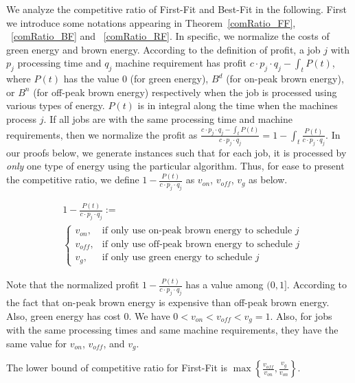 \documentclass[conference]{IEEEtran}
\begin{document}
We analyze the competitive ratio of First-Fit and Best-Fit in the following. First we introduce some notations appearing in Theorem~\ref{comRatio_FF}, ~\ref{comRatio_BF} and ~\ref{comRatio_RF}. In specific, we normalize the costs of green energy and brown energy. According to the definition of profit, a job $j$ with $p_j$ processing time and $q_j$ machine requirement has profit $c \cdot p_j \cdot q_j - \int_t P(t)$, where $P(t)$ has the value $0$ (for green energy), $B^d$ (for on-peak brown energy), or $B^n$ (for off-peak brown energy) respectively when the job is processed using various types of energy. $P(t)$ is in integral along the time when the machines process $j$. If all jobs are with the same processing time and machine requirements, then we normalize the profit as $\frac{c \cdot p_j \cdot q_j - \int_t P(t)}{c \cdot p_j \cdot q_j} = 1 - \int_t \frac{P(t)}{c \cdot p_j \cdot q_j}$. In our proofs below, we generate instances such that for each job, it is processed by \emph{only} one type of energy using the particular algorithm. Thus, for ease to present the competitive ratio, we define $1 - \frac{P(t)}{c \cdot p_j \cdot q_j}$ as $v_{on}$, $v_{off}$, $v_g$ as below.

\begin{align*}
& 1 - \frac{P(t)}{c \cdot p_j \cdot q_j} := \\
& \begin{cases}
v_{on}, & \text{if only use on-peak brown energy to schedule $j$}\\
v_{off}, & \text{if only use off-peak brown energy to schedule $j$}\\
v_g, & \text{if only use green energy to schedule $j$}
\end{cases}
\end{align*}

Note that the normalized profit $1 - \frac{P(t)}{c \cdot p_j \cdot q_j}$ has a value among $(0, 1]$. According to the fact that on-peak brown energy is expensive than off-peak brown energy. Also, green energy has cost $0$. We have $0 < v_{on} < v_{off} < v_g = 1$. Also, for jobs with the same processing times and same machine requirements, they have the same value for $v_{on}$, $v_{off}$, and $v_g$.

\begin{theorem}
The lower bound of competitive ratio for First-Fit is $\max \left\lbrace\frac{v_{off}}{v_{on}}, \frac{v_g}{v_{on}}\right\rbrace$.
\label{comRatio_FF}
\end{theorem}
\end{document}
